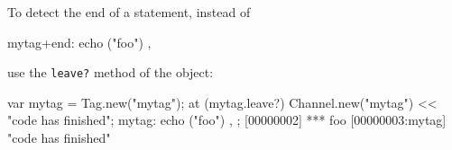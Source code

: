 To detect the end of a statement, instead of

\begin{urbiunchecked}
mytag+end: { echo ("foo") },
\end{urbiunchecked}

\noindent
use the \lstinline{leave?} method of the  object:

\begin{urbiscript}
{
  var mytag = Tag.new("mytag");
  at (mytag.leave?)
    Channel.new("mytag") << "code has finished";
  mytag: { echo ("foo") },
};
[00000002] *** foo
[00000003:mytag] "code has finished"
\end{urbiscript}



